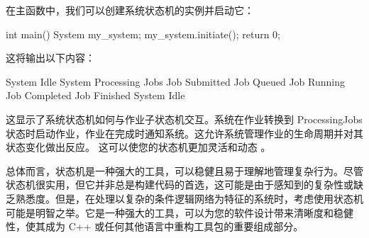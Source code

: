 在主函数中，我们可以创建系统状态机的实例并启动它：

\begin{cpp}
int main() {
    System my_system;
    my_system.initiate();
    return 0;
}
\end{cpp}

这将输出以下内容：

\begin{shell}
System Idle
System Processing Jobs
Job Submitted
Job Queued
Job Running
Job Completed
Job Finished
System Idle
\end{shell}

这显示了系统状态机如何与作业子状态机交互。系统在作业转换到 ProcessingJobs 状态时启动作业，作业在完成时通知系统。这允许系统管理作业的生命周期并对其状态变化做出反应。
这可以使您的状态机更加灵活和动态 。

总体而言，状态机是一种强大的工具，可以稳健且易于理解地管理复杂行为。尽管状态机很实用，但它并非总是构建代码的首选，这可能是由于感知到的复杂性或缺乏熟悉度。但是，在处理以复杂的条件逻辑网络为特征的系统时，考虑使用状态机可能是明智之举。它是一种强大的工具，可以为您的软件设计带来清晰度和稳健性，使其成为 C++ 或任何其他语言中重构工具包的重要组成部分。
